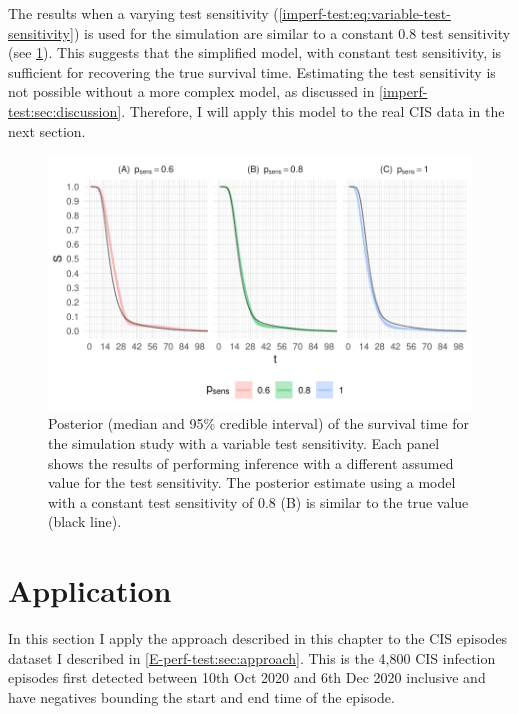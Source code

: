 \documentclass[12pt, letterpaper]{article} %
\begin{document}
The results when a varying test sensitivity (\cref{imperf-test:eq:variable-test-sensitivity}) is used for the simulation are similar to a constant 0.8 test sensitivity (see \cref{imperf-test:fig:variable-test-sensitivity}).
This suggests that the simplified model, with constant test sensitivity, is sufficient for recovering the true survival time.
Estimating the test sensitivity is not possible without a more complex model, as discussed in \cref{imperf-test:sec:discussion}.
Therefore, I will apply this model to the real CIS data in the next section.
\begin{figure}
    \includegraphics[width=\textwidth]{cis-imperfect-testing/sim-variable-sensitivity}
  \caption[Simulation study results with varying test sensitivity]{%
    Posterior (median and 95\% credible interval) of the survival time for the simulation study with a variable test sensitivity.
    Each panel shows the results of performing inference with a different assumed value for the test sensitivity.
    The posterior estimate using a model with a constant test sensitivity of 0.8 (B) is similar to the true value (black line).
  }
  \label{imperf-test:fig:variable-test-sensitivity}
\end{figure}

\section{Application}

In this section I apply the approach described in this chapter to the CIS episodes dataset I described in \cref{E-perf-test:sec:approach}.
This is the 4,800 CIS infection episodes first detected between 10th Oct 2020 and 6th Dec 2020 inclusive and have negatives bounding the start and end time of the episode.
\end{document}
